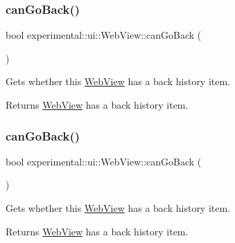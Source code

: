 \subsubsection{\texorpdfstring{can\+Go\+Back()}{canGoBack()}\hspace{0.1cm}{\footnotesize\ttfamily [1/2]}}
{\footnotesize\ttfamily bool experimental\+::ui\+::\+Web\+View\+::can\+Go\+Back (\begin{DoxyParamCaption}{ }\end{DoxyParamCaption})}

Gets whether this \hyperlink{classexperimental_1_1ui_1_1WebView}{Web\+View} has a back history item.

\begin{DoxyReturn}{Returns}
\hyperlink{classexperimental_1_1ui_1_1WebView}{Web\+View} has a back history item. 
\end{DoxyReturn}
\mbox{\label{classexperimental_1_1ui_1_1WebView_a4ecc93bca134d1f5d15ae1e46c292608}} 
\subsubsection{\texorpdfstring{can\+Go\+Back()}{canGoBack()}\hspace{0.1cm}{\footnotesize\ttfamily [2/2]}}
{\footnotesize\ttfamily bool experimental\+::ui\+::\+Web\+View\+::can\+Go\+Back (\begin{DoxyParamCaption}{ }\end{DoxyParamCaption})}

Gets whether this \hyperlink{classexperimental_1_1ui_1_1WebView}{Web\+View} has a back history item.

\begin{DoxyReturn}{Returns}
\hyperlink{classexperimental_1_1ui_1_1WebView}{Web\+View} has a back history item. 
\end{DoxyReturn}
\mbox{\label{classexperimental_1_1ui_1_1WebView_a14f0dfa319d36a74db5afddf1a998b7d}} 
